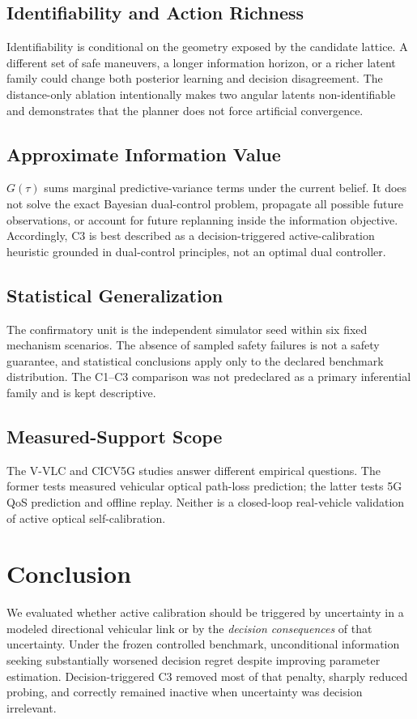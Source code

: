 \documentclass[journal]{IEEEtran}
\begin{document}
\subsection{Identifiability and Action Richness}
Identifiability is conditional on the geometry exposed by the candidate lattice. A different set of safe maneuvers, a longer information horizon, or a richer latent family could change both posterior learning and decision disagreement. The distance-only ablation intentionally makes two angular latents non-identifiable and demonstrates that the planner does not force artificial convergence.

\subsection{Approximate Information Value}
$G(\tau)$ sums marginal predictive-variance terms under the current belief. It does not solve the exact Bayesian dual-control problem, propagate all possible future observations, or account for future replanning inside the information objective. Accordingly, C3 is best described as a decision-triggered active-calibration heuristic grounded in dual-control principles, not an optimal dual controller.

\subsection{Statistical Generalization}
The confirmatory unit is the independent simulator seed within six fixed mechanism scenarios. The absence of sampled safety failures is not a safety guarantee, and statistical conclusions apply only to the declared benchmark distribution. The C1--C3 comparison was not predeclared as a primary inferential family and is kept descriptive.

\subsection{Measured-Support Scope}
The V-VLC and CICV5G studies answer different empirical questions. The former tests measured vehicular optical path-loss prediction; the latter tests 5G QoS prediction and offline replay. Neither is a closed-loop real-vehicle validation of active optical self-calibration.

\section{Conclusion}
We evaluated whether active calibration should be triggered by uncertainty in a modeled directional vehicular link or by the \emph{decision consequences} of that uncertainty. Under the frozen controlled benchmark, unconditional information seeking substantially worsened decision regret despite improving parameter estimation. Decision-triggered C3 removed most of that penalty, sharply reduced probing, and correctly remained inactive when uncertainty was decision irrelevant.
\end{document}
